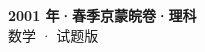 \documentclass[zihao=-4, a4paper]{ctexart}
\begin{document}
\begin{center}
  {\Large\bfseries 2001 年·春季京蒙皖卷·理科}\\[4pt]
  {\large 数学 · 试题版}
\end{center}
\medskip
{}

\end{document}
